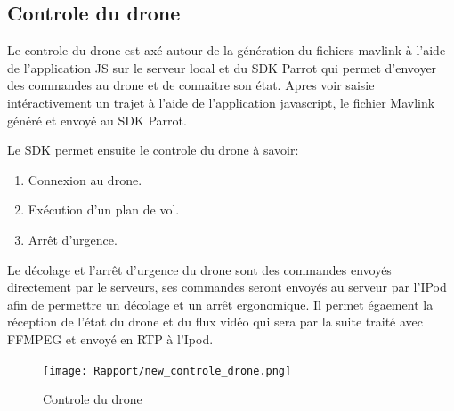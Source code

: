 \documentclass{article}
\begin{document}
\newpage
        
	 \subsection{Controle du drone}
	 Le controle du drone est axé autour de la génération du fichiers mavlink à l'aide de l'application JS sur le serveur local et du SDK Parrot qui permet d'envoyer des commandes au drone et de connaitre son état.
	 \newline
	 Apres voir saisie intéractivement un trajet à l'aide de l'application javascript, le fichier Mavlink généré et envoyé au SDK Parrot. 
	 \vspace{0.1cm}
	 \newline
	 
	 Le SDK permet ensuite le controle du drone à savoir:
	 \begin{enumerate}
        	\item Connexion au drone.
        	\item Exécution d'un plan de vol.
			\item Arrêt d'urgence.
    \end{enumerate}
    Le décolage et l'arrêt d'urgence du drone sont des commandes envoyés directement par le serveurs, ses commandes seront envoyés au serveur par l'IPod afin de permettre un décolage et un arrêt ergonomique.
    \vspace{0.2cm}
    \newline
    Il permet égaement la réception de l'état du drone et du flux vidéo qui sera par la suite traité avec FFMPEG et envoyé en RTP à l'Ipod.
    
	    \vspace*{0.3cm}
	    \begin{center}
		\begin{figure}[!h]
		\texttt{[image: Rapport/new\_controle\_drone.png]}\\
		\caption{Controle du drone}
		\end{figure}
        \end{center}
		
     \newpage
\end{document}
